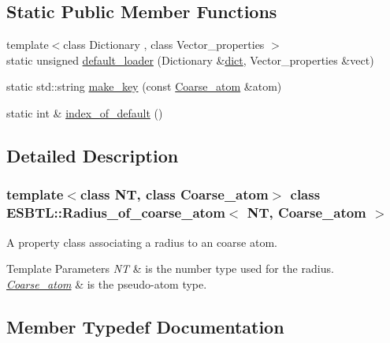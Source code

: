 \subsection*{Static Public Member Functions}
\begin{DoxyCompactItemize}
\item 
{\footnotesize template$<$class Dictionary , class Vector\+\_\+properties $>$ }\\static unsigned \hyperlink{classESBTL_1_1Radius__of__coarse__atom_afa95f7e00c820bb285530dd8825349ec}{default\+\_\+loader} (Dictionary \&\hyperlink{Tsai__jmb__99__radii_8h_a3175002a2df717ae9e433cd2210fea97}{dict}, Vector\+\_\+properties \&vect)
\item 
static std\+::string \hyperlink{classESBTL_1_1Radius__of__coarse__atom_ae5b17fa6eba26e4ee3e25e67adcfe08f}{make\+\_\+key} (const \hyperlink{classESBTL_1_1Coarse__atom}{Coarse\+\_\+atom} \&atom)
\item 
static int \& \hyperlink{classESBTL_1_1Radius__of__coarse__atom_a471c799507f450bc24c8a822514a7374}{index\+\_\+of\+\_\+default} ()
\end{DoxyCompactItemize}


\subsection{Detailed Description}
\subsubsection*{template$<$class NT, class Coarse\+\_\+atom$>$\newline
class E\+S\+B\+T\+L\+::\+Radius\+\_\+of\+\_\+coarse\+\_\+atom$<$ N\+T, Coarse\+\_\+atom $>$}

A property class associating a radius to an coarse atom. 
\begin{DoxyTemplParams}{Template Parameters}
{\em NT} & is the number type used for the radius. \\
\hline
{\em \hyperlink{classESBTL_1_1Coarse__atom}{Coarse\+\_\+atom}} & is the pseudo-\/atom type. \\
\hline
\end{DoxyTemplParams}


\subsection{Member Typedef Documentation}
\mbox{\label{classESBTL_1_1Radius__of__coarse__atom_ade5e52860ae3bd455e1797394fb111c3}} 
